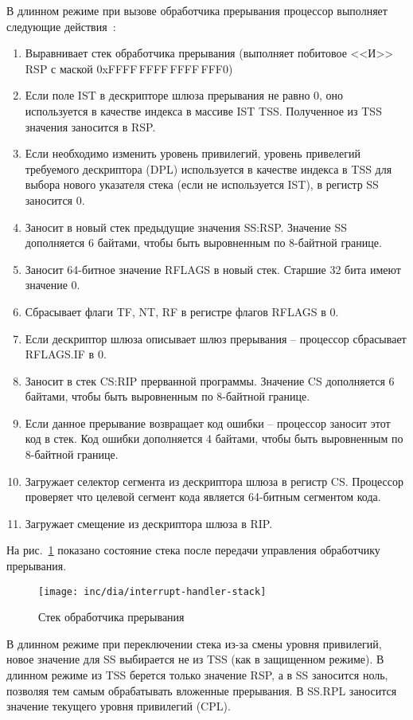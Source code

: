 В длинном режиме при вызове обработчика прерывания процессор выполняет
следующие действия~\cite{amd_pm_v2}:
\begin{enumerate}[1.]
\item Выравнивает стек обработчика прерывания (выполняет побитовое <<И>> RSP с маской 0xFFFF\,FFFF\,FFFF\,FFF0)
\item Если поле IST в дескрипторе шлюза прерывания не равно 0, оно используется в качестве индекса в массиве
	IST TSS. Полученное из TSS значения заносится в RSP.
\item Если необходимо изменить уровень привилегий, уровень привелегий требуемого
	дескриптора (DPL) используется в качестве индекса в TSS для выбора
	нового указателя стека (если не используется IST), в регистр SS заносится 0.
\item Заносит в новый стек предыдущие значения SS:RSP. Значение SS дополняется
	6 байтами, чтобы быть выровненным по 8-байтной границе.
\item Заносит 64-битное значение RFLAGS в новый стек. Старшие 32 бита имеют
	значение 0.
\item Сбрасывает флаги TF, NT, RF в регистре флагов RFLAGS в 0.
\item Если дескриптор шлюза описывает шлюз прерывания -- процессор
	сбрасывает RFLAGS.IF в 0.
\item Заносит в стек CS:RIP прерванной программы. Значение CS дополняется 6
	байтами, чтобы быть выровненным по 8-байтной границе.
\item Если данное прерывание возвращает код ошибки -- процессор заносит этот
	код в стек. Код ошибки дополняется 4 байтами, чтобы быть выровненным
	по 8-байтной границе.
\item Загружает селектор сегмента из дескриптора шлюза в регистр CS. Процессор
	проверяет что целевой сегмент кода является 64-битным сегментом кода.
\item Загружает смещение из дескриптора шлюза в RIP.
\end{enumerate}

На рис.~\ref{fig:interrupt_handler_stack} показано состояние стека после
передачи управления обработчику прерывания.

\begin{figure}[ht!]
  \centering
  \texttt{[image: inc/dia/interrupt-handler-stack]}
  \caption{Стек обработчика прерывания}
  \label{fig:interrupt_handler_stack}
\end{figure}

В длинном режиме при переключении стека из-за смены уровня привилегий,
новое значение для SS выбирается не из TSS (как в защищенном режиме). В
длинном режиме из TSS берется только значение RSP, а в SS заносится ноль,
позволяя тем самым обрабатывать вложенные прерывания. В SS.RPL заносится
значение текущего уровня привилегий (CPL).

